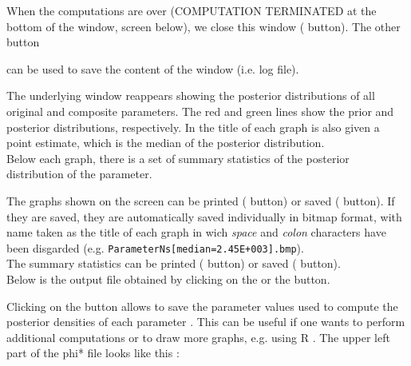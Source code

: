 When the computations are over (\textsf{COMPUTATION TERMINATED} at the bottom of the window, screen below), we close this window ( button). The other button { can be used to save the content of the window (i.e. log file).


\newpage

The underlying window reappears showing the posterior distributions of all original and composite parameters. The red and green lines show the prior and posterior distributions, respectively. In the title of each graph is also given a point estimate, which is the median of the posterior distribution.\\
Below each graph, there is a set of summary statistics of the posterior distribution of the parameter.



The graphs shown on the screen can be printed ( button) or saved (  button). If they are saved, they are automatically saved individually in bitmap format, with name taken as the title of each graph in wich \emph{space} and \emph{colon}  characters have been disgarded (e.g. \texttt{ParameterNs[median=2.45E+003].bmp}).\\
The summary statistics can be printed ( button) or saved (  button). \\

Below is the output file obtained by clicking on the  or the  button.

\newpage

Clicking on the  button allows to save the parameter values used to compute the posterior densities of each parameter \citep[after correction by the weighted linear regression;][]{B2008} . This can be useful if one wants to perform additional computations or to draw more graphs, e.g. using R \citep{IG1996}. The upper left part of the phi* file looks like this :

}

